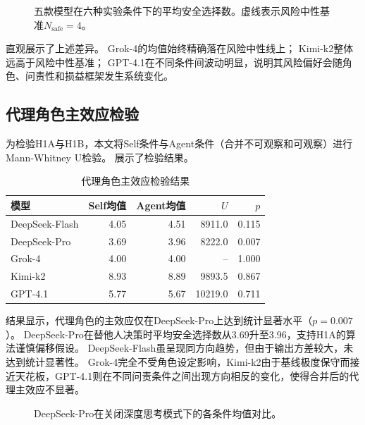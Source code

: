 \documentclass[journal]{vgtc}
\begin{document}
\begin{figure}[!htbp]
  \centering
  
  \caption{五款模型在六种实验条件下的平均安全选择数。虚线表示风险中性基准$N_{\text{safe}}=4$。}
  \label{fig:mean_comparison}
\end{figure}

直观展示了上述差异。
Grok-4的均值始终精确落在风险中性线上；
Kimi-k2整体远高于风险中性基准；
GPT-4.1在不同条件间波动明显，说明其风险偏好会随角色、问责性和损益框架发生系统变化。

\subsection{代理角色主效应检验}

为检验H1A与H1B，本文将Self条件与Agent条件（合并不可观察和可观察）进行Mann-Whitney U检验。
展示了检验结果。

\begin{table}[tb]
  \caption{代理角色主效应检验结果}
  \label{tab:agent_effect}
  \centering
  \footnotesize
  \setlength{\tabcolsep}{3pt}
  \begin{tabular}{lrrrr}
    \toprule
    模型 & Self均值 & Agent均值 & $U$ & $p$ \\
    \midrule
    DeepSeek-Flash & 4.05 & 4.51 & 8911.0 & 0.115 \\
    DeepSeek-Pro & 3.69 & 3.96 & 8222.0 & 0.007 \\
    Grok-4 & 4.00 & 4.00 & -- & 1.000 \\
    Kimi-k2 & 8.93 & 8.89 & 9893.5 & 0.867 \\
    GPT-4.1 & 5.77 & 5.67 & 10219.0 & 0.711 \\
    \bottomrule
  \end{tabular}
\end{table}

结果显示，代理角色的主效应仅在DeepSeek-Pro上达到统计显著水平（$p=0.007$）。
DeepSeek-Pro在替他人决策时平均安全选择数从3.69升至3.96，支持H1A的算法谨慎偏移假设。
DeepSeek-Flash虽呈现同方向趋势，但由于输出方差较大，未达到统计显著性。
Grok-4完全不受角色设定影响，Kimi-k2由于基线极度保守而接近天花板，GPT-4.1则在不同问责条件之间出现方向相反的变化，使得合并后的代理主效应不显著。

\begin{figure}[!htbp]
  \centering
  
  \caption{DeepSeek-Pro在关闭深度思考模式下的各条件均值对比。}
  \label{fig:deepseek_pro_mean}
\end{figure}
\end{document}
